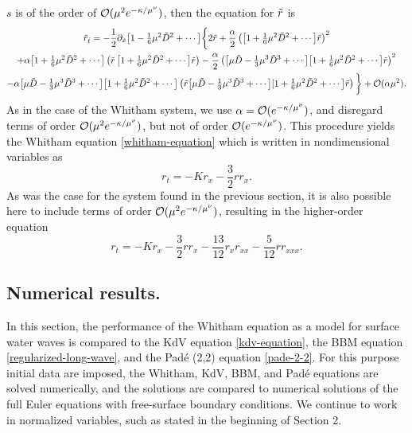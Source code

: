 $s$ is of the order of
${\mathcal{O}}(\mu^2 e^{-\kappa/\mu^\nu})$, then the equation for $\tilde{r}$ is
\begin{multline*}
\tilde{r}_{\tilde{t}} = -\frac{1}{2}\partial_{\tilde{x}} \big[ 1 - {\textstyle{\frac{1}{6}}} \mu^2 \tilde{D}^2 + \cdots \big] 
           \bigg\{ 2 \tilde{r} + \frac{\alpha}{2} \left( \big[1 + {\textstyle{\frac{1}{6}}} \mu^2 \tilde{D}^2 + \cdots \big] 
           \tilde{r} \right)^2 
\\
+ \alpha \big[ 1 + {\textstyle{\frac{1}{6}}} \mu^2 \tilde{D}^2 + \cdots \big] 
   \left( \tilde{r} \, \big[1 + {\textstyle{\frac{1}{6}}} \mu^2 \tilde{D}^2 + \cdots \big]  \tilde{r}  \right)  
- \frac{\alpha}{2} \left( \big[ \mu \tilde{D} - {\textstyle{\frac{1}{3}}} \mu^3 \tilde{D}^3 + \cdots \big] 
    \big[ 1 + {\textstyle{\frac{1}{6}}} \mu^2 \tilde{D}^2 + \cdots \big]  \tilde{r}  \right)^2
\\
- \alpha \big[ \mu \tilde{D} - {\textstyle{\frac{1}{3}}} \mu^3 \tilde{D}^3 + \cdots \big] \big[1 + {\textstyle{\frac{1}{6}}} \mu^2 \tilde{D}^2 + \cdots \big] 
 \left( \tilde{r} \big[ \mu \tilde{D} - {\textstyle{\frac{1}{3}}} \mu^3 \tilde{D}^3 + \cdots \big] [1 + {\textstyle{\frac{1}{6}}} \mu^2 \tilde{D}^2 
    + \cdots \big] \tilde{r} \right) \bigg\} + {\mathcal{O}}(\alpha \mu^2).
\end{multline*}
As in the case of the Whitham system, we use $\alpha = {\mathcal{O}}(e^{- \kappa / \mu^\nu})$,
and disregard terms of order ${\mathcal{O}}(\mu^2 e^{-\kappa/\mu^\nu})$, but not of order ${\mathcal{O}}(e^{-\kappa/\mu^\nu})$.
This procedure yields the Whitham equation \eqref{whitham-equation} 
which is written in nondimensional variables as
\begin{equation*}
r_t = -K r_x - \frac{3}{2} r r_x.
\end{equation*}
As was the case for the system found in the previous section, it is also 
possible here to include terms of order ${\mathcal{O}}(\mu^2 e^{-\kappa/\mu^\nu})$, resulting
in the higher-order equation
\begin{equation*}
r_t = -K r_x - \frac{3}{2} r r_x - \frac{13}{12} r_x r_{xx} - \frac{5}{12} r r_{xxx}.
\end{equation*}
%
%
\subsection{Numerical results.}
%
In this section, the performance of the Whitham
equation as a model for surface water waves 
is compared to the KdV equation \eqref{kdv-equation}, the BBM equation \eqref{regularized-long-wave},
and the Pad\'e (2,2) equation \eqref{pade-2-2}.
For this purpose initial data are imposed, the Whitham, KdV, BBM, and Pad\'e equations are solved numerically,
and the solutions are compared to numerical solutions of the full Euler equations
with free-surface boundary conditions. We continue to work in normalized
variables, such as stated in the beginning of Section 2.

